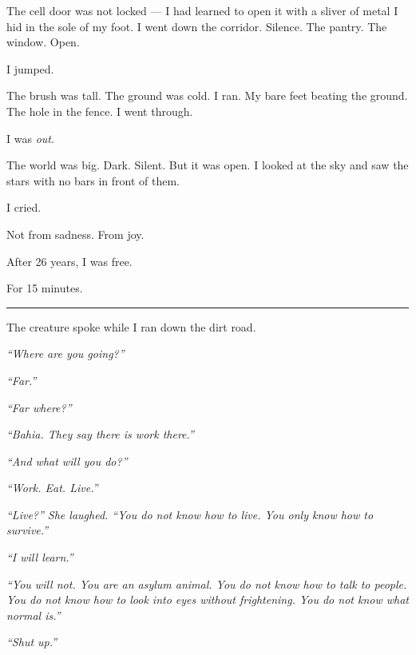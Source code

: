\noindent The cell door was not locked --- I had learned to open it with a sliver of metal I hid in the sole of my foot. I went down the corridor. Silence. The pantry. The window. Open.

\noindent I jumped.

\noindent The brush was tall. The ground was cold. I ran. My bare feet beating the ground. The hole in the fence. I went through.

\noindent I was \textit{out}.

\noindent The world was big. Dark. Silent. But it was open. I looked at the sky and saw the stars with no bars in front of them.

\noindent I cried.

\noindent Not from sadness.
From joy.

\noindent After 26 years, I was free.

\noindent For 15 minutes.

\vspace{0.5em}\noindent\rule{\textwidth}{0.5pt}\vspace{0.5em}

\noindent The creature spoke while I ran down the dirt road.

\noindent \textit{\textquotedblleft{}Where are you going?\textquotedblright{}}

\noindent \textit{\textquotedblleft{}Far.\textquotedblright{}}

\noindent \textit{\textquotedblleft{}Far where?\textquotedblright{}}

\noindent \textit{\textquotedblleft{}Bahia. They say there is work there.\textquotedblright{}}

\noindent \textit{\textquotedblleft{}And what will you do?\textquotedblright{}}

\noindent \textit{\textquotedblleft{}Work. Eat. Live.\textquotedblright{}}

\noindent \textit{\textquotedblleft{}Live?\textquotedblright{}\textit{ She laughed. }\textquotedblleft{}You do not know how to live. You only know how to survive.\textquotedblright{}}

\noindent \textit{\textquotedblleft{}I will learn.\textquotedblright{}}

\noindent \textit{\textquotedblleft{}You will not. You are an asylum animal. You do not know how to talk to people. You do not know how to look into eyes without frightening. You do not know what normal is.\textquotedblright{}}

\noindent \textit{\textquotedblleft{}Shut up.\textquotedblright{}}

